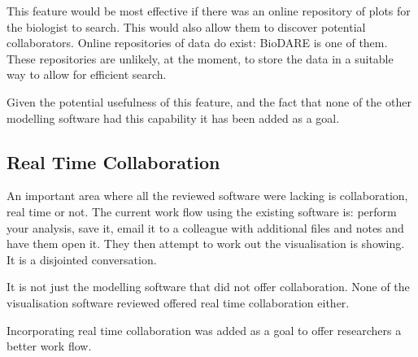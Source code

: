 This feature would be most effective if there was an online repository of plots for the biologist to search.  This would also allow them to discover potential collaborators.  Online repositories of data do exist: BioDARE is one of them.  These repositories are unlikely, at the moment, to store the data in a suitable way to allow for efficient search.

Given the potential usefulness of this feature, and the fact that none of the other modelling software had this capability it has been added as a goal.

\subsection{Real Time Collaboration}

An important area where all the reviewed software were lacking is collaboration, real time or not.  The current work flow using the existing software is: perform your analysis, save it, email it to a colleague with additional files and notes and have them open it. They then attempt to work out the visualisation is showing.  It is a disjointed conversation.

It is not just the modelling software that did not offer collaboration. None of the visualisation software reviewed offered real time collaboration either.

Incorporating real time collaboration was added as a goal to offer researchers a better work flow.

